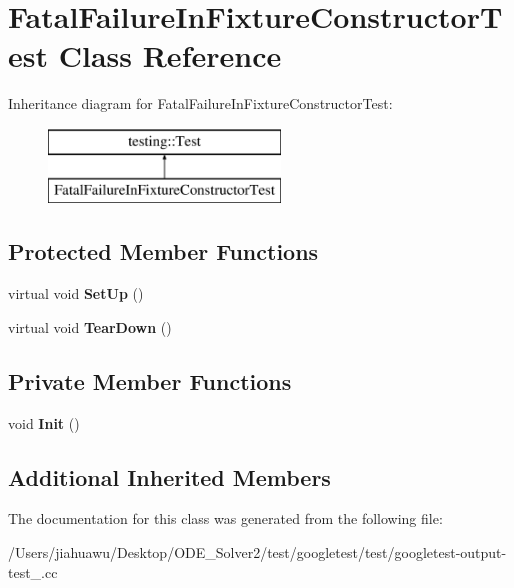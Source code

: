 \hypertarget{class_fatal_failure_in_fixture_constructor_test}{}\section{Fatal\+Failure\+In\+Fixture\+Constructor\+Test Class Reference}
\label{class_fatal_failure_in_fixture_constructor_test}
Inheritance diagram for Fatal\+Failure\+In\+Fixture\+Constructor\+Test\+:\begin{figure}[H]
\begin{center}
\leavevmode
\includegraphics[height=2.000000cm]{class_fatal_failure_in_fixture_constructor_test}
\end{center}
\end{figure}
\subsection*{Protected Member Functions}
\begin{DoxyCompactItemize}
\item 
\mbox{\label{class_fatal_failure_in_fixture_constructor_test_a006d3ac0e7a4ad3c469c3b41dc7c42c3}} 
virtual void {\bfseries Set\+Up} ()
\item 
\mbox{\label{class_fatal_failure_in_fixture_constructor_test_a2763026a557e1fce4e59bd16c4eced57}} 
virtual void {\bfseries Tear\+Down} ()
\end{DoxyCompactItemize}
\subsection*{Private Member Functions}
\begin{DoxyCompactItemize}
\item 
\mbox{\label{class_fatal_failure_in_fixture_constructor_test_a964f36872650e663673ec0ff67e43acf}} 
void {\bfseries Init} ()
\end{DoxyCompactItemize}
\subsection*{Additional Inherited Members}


The documentation for this class was generated from the following file\+:\begin{DoxyCompactItemize}
\item 
/\+Users/jiahuawu/\+Desktop/\+O\+D\+E\+\_\+\+Solver2/test/googletest/test/googletest-\/output-\/test\+\_\+.\+cc\end{DoxyCompactItemize}
